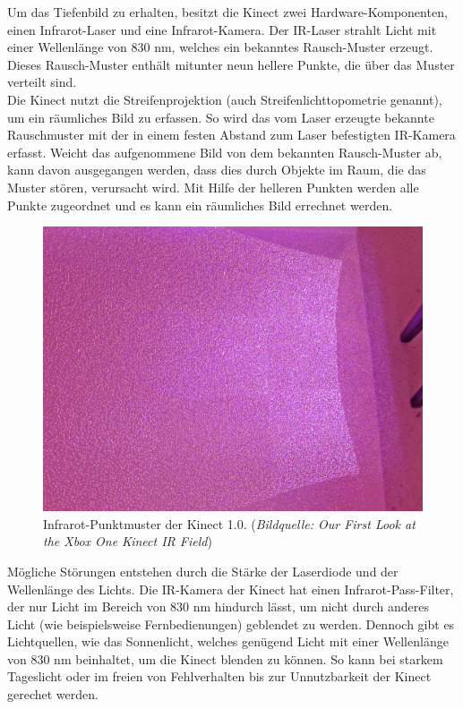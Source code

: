 \documentclass[12pt,a4paper,ngerman]{scrartcl}
\begin{document}
Um das Tiefenbild zu erhalten, besitzt die Kinect zwei Hardware-Komponenten, einen
Infrarot-Laser und eine Infrarot-Kamera. Der IR-Laser strahlt Licht mit einer Wellenlänge
von 830 nm, welches ein bekanntes Rausch-Muster erzeugt. Dieses Rausch-Muster enthält
mitunter neun hellere Punkte, die über das Muster verteilt sind.\\
Die Kinect nutzt die Streifenprojektion (auch Streifenlichttopometrie genannt), um ein
räumliches Bild zu erfassen. So wird das vom Laser erzeugte bekannte Rauschmuster mit der
in einem festen Abstand zum Laser befestigten IR-Kamera erfasst. Weicht das aufgenommene
Bild von dem bekannten Rausch-Muster ab, kann davon ausgegangen werden, dass dies durch
Objekte im Raum, die das Muster stören, verursacht wird. Mit Hilfe der helleren Punkten werden
alle Punkte zugeordnet und es kann ein räumliches Bild errechnet werden.

\begin{figure}[H]
    \centering
    \includegraphics[scale=0.33]{img/kinect_infrared.jpg}
    \caption{Infrarot-Punktmuster der Kinect 1.0. ({\em Bildquelle: Our First Look at the Xbox One Kinect IR Field\cite{kinect2:infrared}})}
\end{figure}

Mögliche Störungen entstehen durch die Stärke der Laserdiode und der Wellenlänge des Lichts.
Die IR-Kamera der Kinect hat einen Infrarot-Pass-Filter, der nur Licht im Bereich von 830 nm
hindurch lässt, um nicht durch anderes Licht (wie beispielsweise Fernbedienungen) geblendet zu
werden. Dennoch gibt es Lichtquellen, wie das Sonnenlicht, welches genügend Licht mit einer
Wellenlänge von 830 nm  beinhaltet, um die Kinect blenden zu können. So kann bei starkem
Tageslicht oder im freien von Fehlverhalten bis zur Unnutzbarkeit der Kinect gerechet werden.
\end{document}
